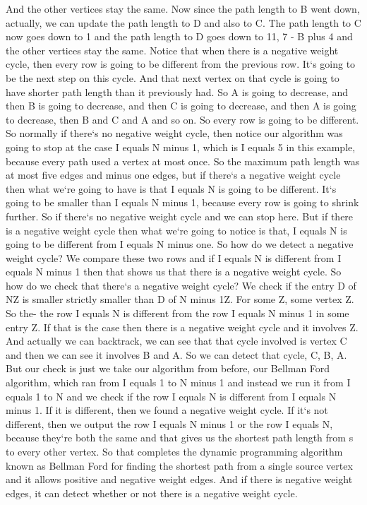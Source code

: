 And the other vertices stay the same.
Now since the path length to B went down, actually, we can update the path length to D and also to C\@.
The path length to C now goes down to 1 and the path length to D goes down to 11, 7 - B plus 4 and the other vertices stay the same.
Notice that when there is a negative weight cycle, then every row is going to be different from the previous row.
It`s going to be the next step on this cycle.
And that next vertex on that cycle is going to have shorter path length than it previously had.
So A is going to decrease, and then B is going to decrease, and then C is going to decrease, and then A is going to decrease, then B and C and A and so on.
So every row is going to be different.
So normally if there`s no negative weight cycle, then notice our algorithm was going to stop at the case I equals N minus 1, which is I equals 5 in this example, because every path used a vertex at most once.
So the maximum path length was at most five edges and minus one edges, but if there`s a negative weight cycle then what we`re going to have is that I equals N is going to be different.
It`s going to be smaller than I equals N minus 1, because every row is going to shrink further.
So if there`s no negative weight cycle and we can stop here.
But if there is a negative weight cycle then what we`re going to notice is that, I equals N is going to be different from I equals N minus one.
So how do we detect a negative weight cycle? We compare these two rows and if I equals N is different from I equals N minus 1 then that shows us that there is a negative weight cycle.
So how do we check that there`s a negative weight cycle? We check if the entry D of NZ is smaller strictly smaller than D of N minus 1Z\@.
For some Z, some vertex Z\@.
So the- the row I equals N is different from the row I equals N minus 1 in some entry Z\@.
If that is the case then there is a negative weight cycle and it involves Z\@.
And actually we can backtrack, we can see that that cycle involved is vertex C and then we can see it involves B and A\@.
So we can detect that cycle, C, B, A\@.
But our check is just we take our algorithm from before, our Bellman Ford algorithm, which ran from I equals 1 to N minus 1 and instead we run it from I equals 1 to N and we check if the row I equals N is different from I equals N minus 1.
If it is different, then we found a negative weight cycle.
If it`s not different, then we output the row I equals N minus 1 or the row I equals N, because they`re both the same and that gives us the shortest path length from s to every other vertex.
So that completes the dynamic programming algorithm known as Bellman Ford for finding the shortest path from a single source vertex and it allows positive and negative weight edges.
And if there is negative weight edges, it can detect whether or not there is a negative weight cycle.

